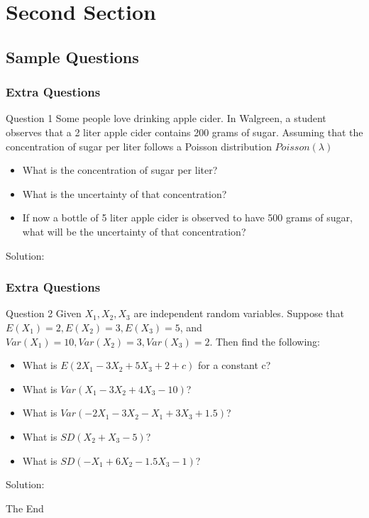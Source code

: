 \documentclass{beamer}
\begin{document}

\section{Second Section}
\subsection{Sample Questions}




\begin{frame}
\frametitle{Extra Questions}
\begin{block}{Question 1}
Some people love drinking apple cider. In Walgreen, a student observes that a 2 liter apple cider contains 200 grams of sugar. Assuming that the concentration of sugar per liter follows a Poisson distribution $Poisson(\lambda)$
\begin{itemize}
\item What is the concentration of sugar per liter?
\item What is the uncertainty of that concentration?
\item If now a bottle of 5 liter apple cider is observed to have 500 grams of sugar, what will be the uncertainty of that concentration?
\end{itemize}
\end{block}

\begin{block}{Solution:}

\end{block}


\end{frame}



\begin{frame}
\frametitle{Extra Questions}
\begin{block}{Question 2}
Given $X_1, X_2, X_3$ are independent random variables. Suppose that $E(X_1) = 2, E(X_2) = 3, E(X_3) = 5$, and $Var(X_1) = 10, Var(X_2) = 3, Var(X_3) = 2$. Then find the following:
\begin{itemize}
\item What is $E(2X_1 - 3X_2 + 5X_3 +2 + c)$ for a constant c?
\item What is $Var(X_1 - 3X_2 + 4X_3 - 10)$?
\item What is $Var(-2X_1 - 3X_2 - X_1 + 3X_3 + 1.5)$?
\item What is $SD(X_2 + X_3 -5)$?
\item What is $SD(-X_1 + 6X_2 - 1.5 X_3 -1)$?
\end{itemize}
\end{block}

\begin{block}{Solution:}

\end{block}


\end{frame}


\begin{frame}
\Huge{\centerline{The End}}
\end{frame}

\end{document}
